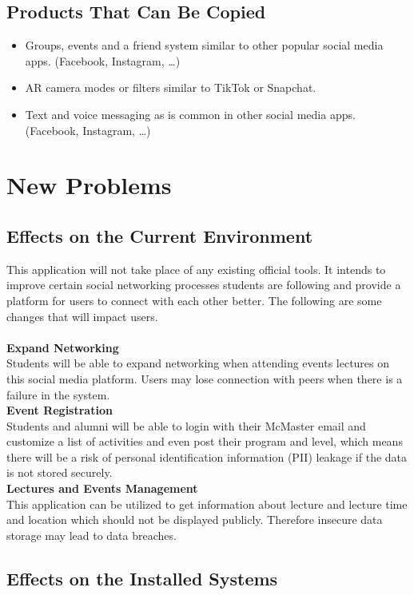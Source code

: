 \documentclass[12pt]{article}
\begin{document}
\subsection{Products That Can Be Copied}
\begin{itemize}
  \item Groups, events and a friend system similar to other popular social media apps. (Facebook, Instagram, \dots)
  \item AR camera modes or filters similar to TikTok or Snapchat.
  \item Text and voice messaging as is common in other social media apps. (Facebook, Instagram, \dots)
\end{itemize}
\section{New Problems}
\subsection{Effects on the Current Environment}

This application will not take place of any existing official tools. It intends to improve certain social networking processes students are following and provide a platform for users to connect with each other better. The following are some changes that will impact users.\\
\noindent\\
\textbf{Expand Networking}\\
Students will be able to expand networking when attending events lectures on this social media platform. Users may lose connection with peers when there is a failure in the system. 
\noindent\\
\textbf{Event Registration}\\
Students and alumni will be able to login with their McMaster email and customize a list of activities and even post their program and level, which means there will be a risk of personal identification information (PII) leakage if the data is not stored securely.
\noindent\\
\textbf{Lectures and Events Management}\\
This application can be utilized to get information about lecture and lecture time and location which should not be displayed publicly. Therefore insecure data storage may lead to data breaches.

\subsection{Effects on the Installed Systems}
\end{document}
